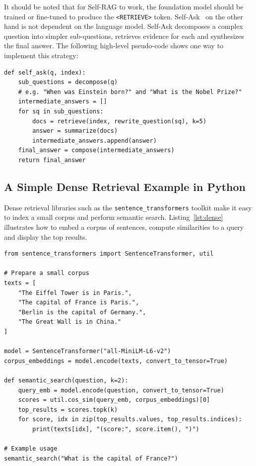 It should be noted that for Self-RAG to work, the foundation model should be trained or fine-tuned to produce the \texttt{<RETRIEVE>} token.
Self‑Ask~\citep{press2022measuring} on the other hand is not dependent on the language model. Self-Ask decomposes a complex question into simpler sub‑questions, retrieves evidence for each and synthesizes the final answer.  The following high‑level pseudo-code shows one way to implement this strategy:

\begin{listing}[!ht]
\begin{verbatim}
def self_ask(q, index):
    sub_questions = decompose(q)  
    # e.g. "When was Einstein born?" and "What is the Nobel Prize?"
    intermediate_answers = []
    for sq in sub_questions:
        docs = retrieve(index, rewrite_question(sq), k=5)
        answer = summarize(docs)
        intermediate_answers.append(answer)
    final_answer = compose(intermediate_answers)
    return final_answer
\end{verbatim}
\caption{High Level Pseudo-Code Demonstrating Self-Ask}
\label{lst:selfask}
\end{listing}


\subsection{A Simple Dense Retrieval Example in Python}

Dense retrieval libraries such as the \texttt{sentence\_transformers} toolkit make it easy to index a small corpus and perform semantic search.  Listing~\ref{lst:dense} illustrates how to embed a corpus of sentences, compute similarities to a query and display the top results.

\begin{listing}[!ht]
\begin{verbatim}
from sentence_transformers import SentenceTransformer, util

# Prepare a small corpus
texts = [
    "The Eiffel Tower is in Paris.",
    "The capital of France is Paris.",
    "Berlin is the capital of Germany.",
    "The Great Wall is in China."
]

model = SentenceTransformer("all-MiniLM-L6-v2")
corpus_embeddings = model.encode(texts, convert_to_tensor=True)

def semantic_search(question, k=2):
    query_emb = model.encode(question, convert_to_tensor=True)
    scores = util.cos_sim(query_emb, corpus_embeddings)[0]
    top_results = scores.topk(k)
    for score, idx in zip(top_results.values, top_results.indices):
        print(texts[idx], "(score:", score.item(), ")")

# Example usage
semantic_search("What is the capital of France?")
\end{verbatim}
\caption{A Simple Dense Retrieval Example in Python}
\label{lst:dense}
\end{listing}



